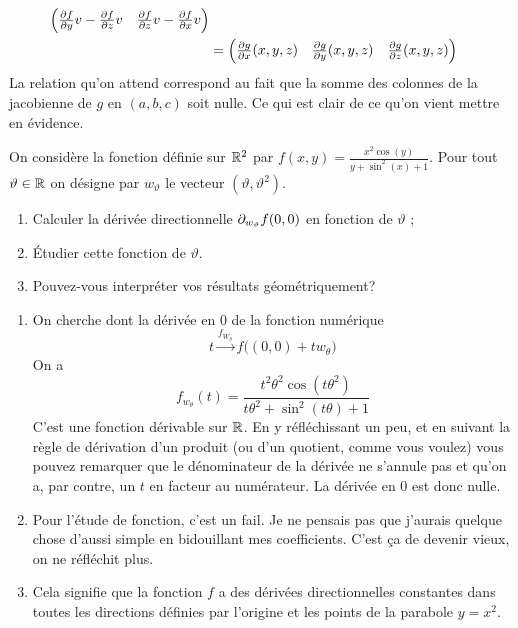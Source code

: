 \documentclass[11pt, a4paper]{article}
\begin{document}
\begin{solution}
\begin{align}
\begin{pmatrix}
                              \frac{\partial f}{\partial y}v
                              - \frac{\partial f}{\partial z}v &
                              \frac{\partial f}{\partial z}v
                              -\frac{\partial f}{\partial x}v
                            \end{pmatrix}\\
                          & =
                            \begin{pmatrix}
                              \frac{\partial g}{\partial x}(x, y, z) &
                              \frac{\partial g}{\partial y}(x, y, z) &
                              \frac{\partial g}{\partial z}(x, y, z)
                            \end{pmatrix}
  \end{align}
  La relation qu'on attend correspond au fait que la somme des
  colonnes de la jacobienne de $g$ en $(a, b, c)$ soit nulle. Ce qui
  est clair de ce qu'on vient mettre en évidence.
\end{solution}

\begin{question}
  On considère la fonction définie sur $\mathbb{R}^2$ par
  $f(x, y) = \frac{x^2\cos(y)}{y + \sin^2(x) + 1}$. Pour tout
  $\vartheta \in \mathbb{R}$ on désigne par $w_\vartheta$ le vecteur
  $(\vartheta, \vartheta^2)$.
  \begin{enumerate}
  \item Calculer la dérivée directionnelle $\partial_{w_\vartheta}f(0, 0)$
    en fonction de $\vartheta$ ;
  \item Étudier cette fonction de $\vartheta$.
  \item Pouvez-vous interpréter vos résultats géométriquement?
  \end{enumerate}
\end{question}
\begin{solution}
  \begin{enumerate}
  \item
    On cherche dont la dérivée en $0$ de la fonction numérique
    \[
    t \xrightarrow{f_{W_\theta}} f\big((0,0) + tw_\theta\big)
    \]
    On a
    \[
    f_{w_\theta}(t) = \dfrac{t^2\theta^2\cos(t\theta^2)}{t\theta^2 + \sin^2(t\theta) + 1}
    \]
    C'est une fonction dérivable sur $\mathbb{R}$. En y réfléchissant un peu, et
    en suivant la règle de dérivation d'un produit (ou d'un quotient,
    comme vous voulez) vous pouvez remarquer que le dénominateur de la
    dérivée ne s'annule pas et qu'on a, par contre, un $t$ en facteur au
    numérateur. La dérivée en $0$ est donc nulle.
  \item
    Pour l'étude de fonction, c'est un fail. Je ne pensais pas que
    j'aurais quelque chose d'aussi simple en bidouillant mes
    coefficients. C'est \c{c}a de devenir vieux, on ne réfléchit plus.
  \item
    Cela signifie que la fonction $f$ a des dérivées directionnelles
    constantes dans toutes les directions définies par l'origine et
    les points de la parabole $y = x^2$.
  \end{enumerate}
\end{solution}
\end{document}
